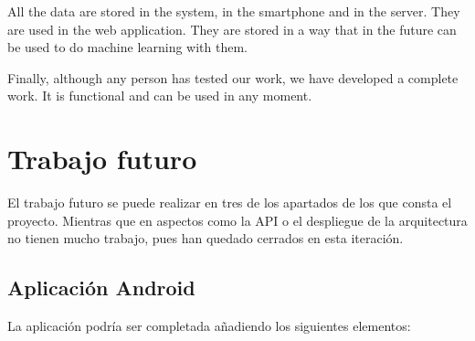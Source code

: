 All the data are stored in the system, in the smartphone and in the server. They are used in the web application. They are stored in a way that in the future can be used to do machine learning with them.
\newline

Finally, although any person has tested our work, we have developed a complete work. It is functional and can be used in any moment.
\newpage

\section{Trabajo futuro}
El trabajo futuro se puede realizar en tres de los apartados de los que consta el proyecto. Mientras que en aspectos como la API o el despliegue de la arquitectura no tienen mucho trabajo, pues han quedado cerrados en esta iteración.

\subsection{Aplicación Android}
La aplicación podría ser completada añadiendo los siguientes elementos:

